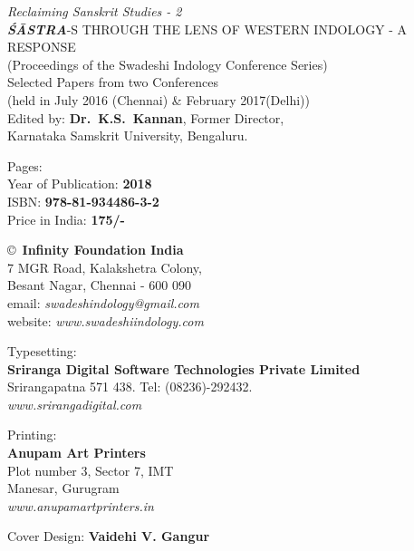 \thispagestyle{empty}
\noindent
{\fontsize{9}{11}\selectfont\sl Reclaiming Sanskrit Studies - 2}\\
{\sl\bfseries ŚĀSTRA}-S THROUGH THE LENS OF WESTERN INDOLOGY - A RESPONSE\\ 
(Proceedings of the Swadeshi Indology Conference Series)\\
Selected Papers from two Conferences\\ 
(held in July 2016 (Chennai) \& February 2017(Delhi))\\
Edited by: {\bf Dr.\ K.S.\ Kannan}, Former Director,\\ 
Karnataka Samskrit University, Bengaluru.
\vfill

\noindent
Pages: {\bf\pageref{bookend}}\\
Year of Publication: {\bf 2018}\\
ISBN: {\bf 978-81-934486-3-2}\\
Price in India: {\bf 175/-}
\vfill

\noindent
\copyright\ {\bf Infinity Foundation India}\\ 
7 MGR Road, Kalakshetra Colony,\\ 
Besant Nagar, Chennai - 600 090\\
email: {\sl swadeshindology@gmail.com}\\
website: {\sl www.swadeshiindology.com} 
\vfill

\noindent
Typesetting:\\ 
{\bf Sriranga Digital Software Technologies Private Limited}\\ 
Srirangapatna 571 438. Tel: (08236)-292432.\\
{\sl www.srirangadigital.com}
\vfill

\noindent
Printing:\\
{\bf Anupam Art Printers}\\
Plot number 3, Sector 7, IMT\\
Manesar, Gurugram\\
{\sl www.anupamartprinters.in}
\noindent

\bigskip

Cover Design: {\bf Vaidehi V. Gangur}
